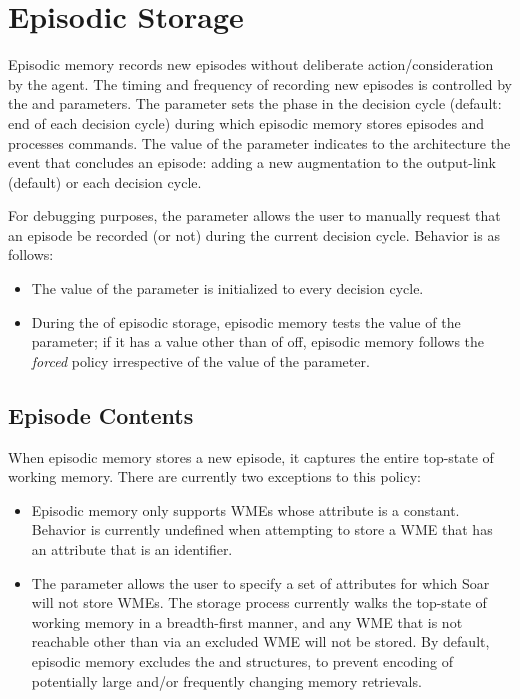 \section{Episodic Storage}
\label{EPMEM-storage}

Episodic memory records new episodes without deliberate action/consideration by the agent.
The timing and frequency of recording new episodes is controlled by the  and  parameters.
The  parameter sets the phase in the decision cycle (default: end of each decision cycle) during which episodic memory stores episodes and processes commands.
The value of the  parameter indicates to the architecture the event that concludes an episode: adding a new augmentation to the output-link (default) or each decision cycle.

For debugging purposes, the  parameter allows the user to manually request that an episode be recorded (or not) during the current decision cycle.
Behavior is as follows:

\vspace{-8pt}
\begin{itemize}
\item
	The value of the  parameter is initialized to  every decision cycle.
	\vspace{-6pt}
\item
	During the  of episodic storage, episodic memory tests the value of the  parameter; if it has a value other than of off, episodic memory follows the \emph{forced} policy irrespective of the value of the  parameter.
	\vspace{-6pt}
\end{itemize}

\subsection{Episode Contents}

When episodic memory stores a new episode, it captures the entire top-state of working memory.
There are currently two exceptions to this policy:

\begin{itemize}
\item
Episodic memory only supports WMEs whose attribute is a constant.
Behavior is currently undefined when attempting to store a WME that has an attribute that is an identifier.

\item
The  parameter allows the user to specify a set of attributes for which Soar will not store WMEs.
The storage process currently walks the top-state of working memory in a breadth-first manner, and any WME that is not reachable other than via an excluded WME will not be stored.
By default, episodic memory excludes the  and  structures, to prevent encoding of potentially large and/or frequently changing memory retrievals.

\end{itemize}

